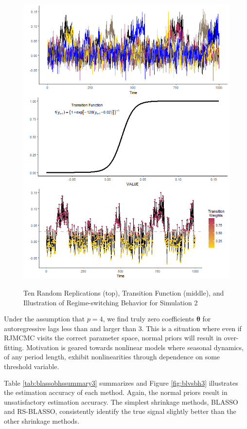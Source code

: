 \begin{figure}
	\centering
	\caption{Ten Random Replications (top), Transition Function (middle), and Illustration of Regime-switching Behavior  for Simulation 2}
	\includegraphics[scale=.7]{sim2plots}
	\label{fig:sim2plots}
\end{figure}

 Under the assumption that $p=4$, we find truly zero coefficients  $\bm{\theta}$ for autoregressive lags less than and larger than 3. This is a situation where even if RJMCMC visits the correct parameter space, normal priors will result in over-fitting. Motivation is geared towards nonlinear models where seasonal dynamics, of any period length, exhibit nonlinearities through dependence on some threshold variable.

Table \ref{tab:blassobhssummary3} summarizes and Figure \ref{fig:blvsbh3} illustrates the estimation accuracy of each method. Again, the normal priors result in unsatisfactory estimation accuracy. The simplest shrinkage methods, BLASSO and RS-BLASSO, consistently identify the true signal slightly better than the other shrinkage methods. 


